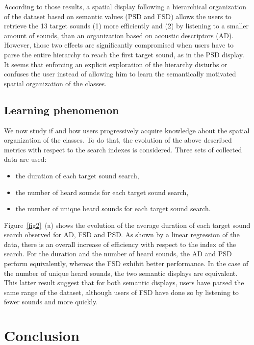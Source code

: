 \documentclass{aes2e}
\begin{document}
According to those results, a spatial display following a hierarchical organization of the dataset based on semantic values (PSD and FSD) allows the users to retrieve the 13 target sounds (1) more efficiently and (2) by listening to a smaller amount of sounds, than an organization based on acoustic descriptors (AD). However, those two effects are significantly compromised when users have to parse the entire hierarchy to reach the first target sound, as in the PSD display. It seems that enforcing an explicit exploration of the hierarchy disturbs or confuses the user instead of allowing him to learn the semantically motivated spatial organization of the classes. 


\subsection{Learning phenomenon}

We now study if and how users  progressively acquire knowledge about the spatial organization of the classes. To do that, the evolution of the above described metrics with respect to the search indexes is considered. Three sets of collected data are used:

\begin{itemize}
\item the duration of each target sound search,
\item the number of heard sounds for each target sound search,
\item the number of unique heard sounds for each target sound search. 
\end{itemize}

Figure~\ref{fig2}~(a) shows the evolution of the average duration of each target sound search observed for AD, FSD and PSD. As shown by a linear regression of the data, there is an overall increase of efficiency with respect to the index of the search. For the duration and the number of heard sounds, the AD and PSD perform equivalently, whereas the FSD exhibit better performance. In the case of the number of unique heard sounds, the two semantic displays are equivalent. This latter result suggest that for both semantic displays, users have parsed the same range of the dataset, although users of FSD have done so by listening to fewer sounds and more quickly. 

\section{Conclusion}
\end{document}
